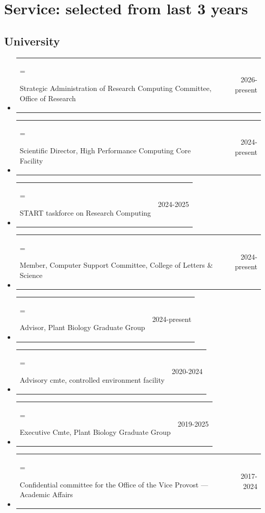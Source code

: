 \documentclass[letterpaper,10pt]{article}
\makeatletter
\newcommand{\ignore}[1]{}
\newlength{\cvhang}\setlength{\cvhang}{1.5em}
\newcommand{\cvitem}[3][\cvhang]{%
  \item\begin{tabularx}{\dimexpr\linewidth+\cvhang\relax}{@{}>{\hangindent=#1\hangafter=1\raggedright\arraybackslash}X@{\hspace{1.5em}}r@{}}
    #2 & #3
  \end{tabularx}%
}
\makeatother
\begin{document}
\section*{Service: selected from last 3 years}
\subsection*{University}
\begin{itemize}
\cvitem{Strategic Administration of Research Computing Committee, Office of Research}{2026-present}
\cvitem{Scientific Director, High Performance Computing Core Facility}{2024-present}
\cvitem{START taskforce on Research Computing}{2024-2025}
\cvitem{Member, Computer Support Committee, College of Letters \& Science}{2024-present}
\cvitem{Advisor, Plant Biology Graduate Group}{2024-present}
\cvitem{Advisory cmte, controlled environment facility}{2020-2024}
\cvitem{Executive Cmte, Plant Biology Graduate Group}{2019-2025}
\cvitem{Confidential committee for the Office of the Vice Provost --- Academic Affairs}{2017-2024}%

\end{itemize}
\end{document}

